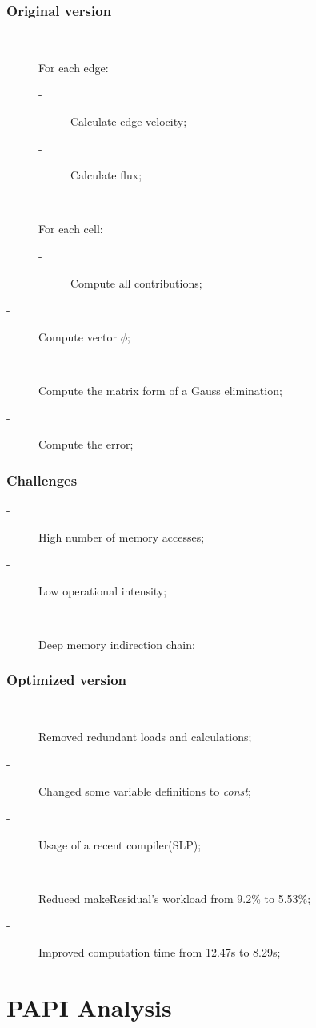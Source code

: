 \documentclass{beamer}
\begin{document}
\begin{frame}
	\frametitle{Original version}
	\begin{description}
	\item [-] For each edge:
	\begin{description}
		\item [-] Calculate edge velocity;
		\item [-] Calculate flux;
	\end{description}
	\item [-] For each cell:
	\begin{description}
		\item [-] Compute all contributions;
	\end{description}
	\item [-] Compute vector $\phi$;
	\item [-] Compute the matrix form of a Gauss elimination;
	\item [-] Compute the error;
	\end{description}
\end{frame}

\begin{frame}
	\frametitle{Challenges}
	\begin{description}
	\item [-] High number of memory accesses;
	\item [-] Low operational intensity;
	\item [-] Deep memory indirection chain;
	\end{description}
\end{frame}

\begin{frame}
	\frametitle{Optimized version}
	\begin{description}
		\item [-] Removed redundant loads and calculations;
		\item [-] Changed some variable definitions to \emph{const};
		\item [-] Usage of a recent compiler(SLP);
		\item [-] Reduced makeResidual's workload from 9.2\% to 5.53\%;
		\item [-] Improved computation time from 12.47s to 8.29s;
	\end{description} 
\end{frame}

\section{PAPI Analysis}
\end{document}
